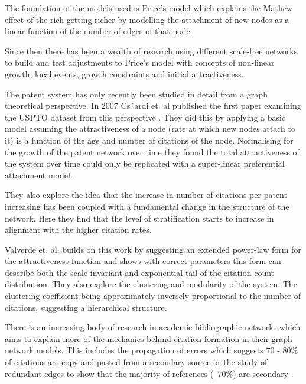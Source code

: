 \documentclass[12pt,journal,compsoc]{IEEEtran}
\begin{document}
The foundation of the models used is Price's model which \cite{price1976general}explains the Mathew effect \cite{merton1968matthew} of the rich getting richer by modelling the attachment of new nodes as a linear function of the number of edges of that node. 

Since then there has been a wealth of research using different scale-free networks to build and test adjustments to Price's model with concepts of non-linear growth, local events, growth constraints and initial attractiveness\cite{albert2002statistical}.  

The patent system has only recently been studied in detail from a graph theoretical perspective. In 2007 Cs´ardi et. al published the first paper examining the USPTO dataset from this perspective \cite{csardi2007modeling}. They did this by applying a basic model assuming the attractiveness of a node (rate at which new nodes attach to it) is a function of the age and number of citations of the node. Normalising for the growth of the patent network over time they found the total attractiveness of the system over time could only be replicated with a super-linear preferential attachment model. 

They also explore the idea that the increase in number of citations per patent increasing has been coupled with a fundamental change in the structure of the network. Here they find that the level of stratification starts to increase in alignment with the higher citation rates. 

Valverde et. al. \cite{valverde2007topology} builds on this work by suggesting an extended power-law form for the attractiveness function and shows with correct parameters this form can describe both the scale-invariant and exponential tail of the citation count distribution. They also explore the clustering and modularity of the system. The clustering coefficient being approximately inversely proportional to the number of citations, suggesting a hierarchical structure. 

There is an increasing body of research in academic bibliographic networks which aims to explain more of the mechanics behind citation formation in their graph network models. This includes the propagation of errors which suggests 70 - 80\% of citations are copy and pasted from a secondary source \cite{simkin2005stochastic} or the study of redundant edges to show that the majority of references (~70\%) are secondary \cite{clough2015transitive}.  
\end{document}
